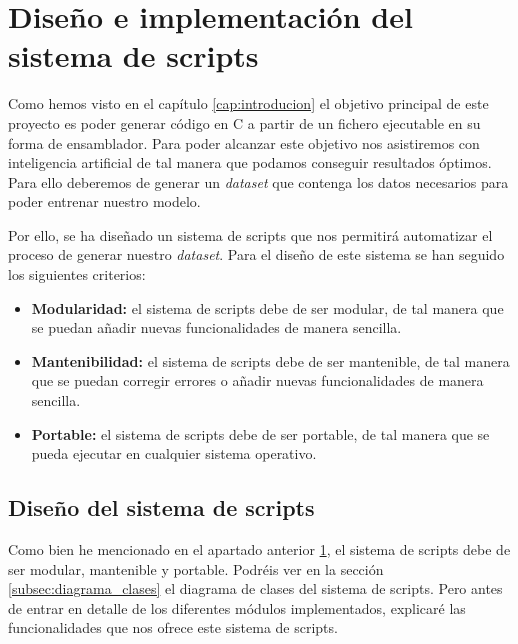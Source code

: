 \chapter{Diseño e implementación del sistema de scripts}
\label{cap:diseñoImplentacion_scripts}


Como hemos visto en el capítulo \ref{cap:introducion} el objetivo principal de este
proyecto es poder generar código en C a partir de un fichero ejecutable en su forma
de ensamblador. Para poder alcanzar este objetivo nos asistiremos con inteligencia
artificial de tal manera que podamos conseguir resultados óptimos. Para ello deberemos
de generar un \textit{dataset} que contenga los datos necesarios para poder entrenar
nuestro modelo.

Por ello, se ha diseñado un sistema de scripts que nos permitirá automatizar el proceso
de generar nuestro \textit{dataset}. Para el diseño de este sistema se han seguido los
siguientes criterios:

\begin{itemize}
    \item \textbf{Modularidad:} el sistema de scripts debe de ser modular, de tal manera
        que se puedan añadir nuevas funcionalidades de manera sencilla.
    \item \textbf{Mantenibilidad:} el sistema de scripts debe de ser mantenible, de tal
        manera que se puedan corregir errores o añadir nuevas funcionalidades de manera
        sencilla.
    \item \textbf{Portable:} el sistema de scripts debe de ser portable, de tal manera
        que se pueda ejecutar en cualquier sistema operativo.
\end{itemize}

\section{Diseño del sistema de scripts}
\label{sec:diseño_sistema_scripts}


Como bien he mencionado en el apartado anterior \ref{cap:diseñoImplentacion_scripts}, el
sistema de scripts debe de ser modular, mantenible y portable. Podréis ver en la sección
\ref{subsec:diagrama_clases} el diagrama de clases del sistema de scripts. Pero antes de
entrar en detalle de los diferentes módulos implementados, explicaré las funcionalidades
que nos ofrece este sistema de scripts.

